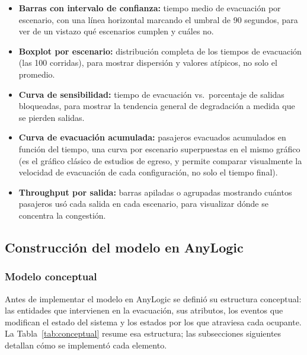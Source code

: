 \documentclass[a4paper, 11pt]{article}
\begin{document}
\begin{itemize}[leftmargin=2em]
    \item \textbf{Barras con intervalo de confianza:} tiempo medio de evacuaci\'on
          por escenario, con una l\'inea horizontal marcando el umbral de 90
          segundos, para ver de un vistazo qu\'e escenarios cumplen y cu\'ales no.
    \item \textbf{Boxplot por escenario:} distribuci\'on completa de los tiempos de
          evacuaci\'on (las 100 corridas), para mostrar dispersi\'on y valores
          at\'ipicos, no solo el promedio.
    \item \textbf{Curva de sensibilidad:} tiempo de evacuaci\'on vs.\ porcentaje de
          salidas bloqueadas, para mostrar la tendencia general de degradaci\'on a
          medida que se pierden salidas.
    \item \textbf{Curva de evacuaci\'on acumulada:} pasajeros evacuados acumulados en
          funci\'on del tiempo, una curva por escenario superpuestas en el mismo
          gr\'afico (es el gr\'afico cl\'asico de estudios de egreso, y permite
          comparar visualmente la velocidad de evacuaci\'on de cada configuraci\'on,
          no solo el tiempo final).
    \item \textbf{Throughput por salida:} barras apiladas o agrupadas mostrando
          cu\'antos pasajeros us\'o cada salida en cada escenario, para visualizar
          d\'onde se concentra la congesti\'on.
\end{itemize}

\newpage
\subsection{Construcci\'on del modelo en AnyLogic}\label{sec:construccion}

\subsubsection{Modelo conceptual}\label{sub:conceptual}

Antes de implementar el modelo en AnyLogic se defini\'o su estructura conceptual:
las entidades que intervienen en la evacuaci\'on, sus atributos, los eventos que
modifican el estado del sistema y los estados por los que atraviesa cada ocupante.
La Tabla~\ref{tab:conceptual} resume esa estructura; las subsecciones siguientes
detallan c\'omo se implement\'o cada elemento.
\end{document}
